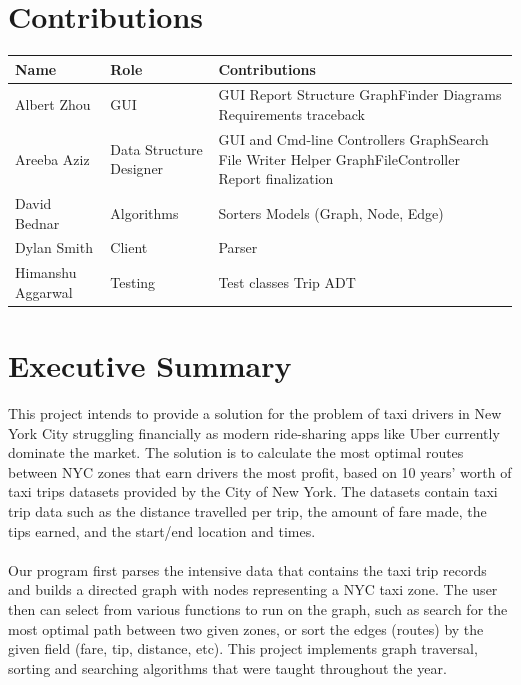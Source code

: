 \documentclass[12pt]{article}
\begin{document}
\newpage

\section*{Contributions}

\begin{tabular}{|p{4cm}|p{5.5cm}|p{7cm}|}
\hline
\textbf{Name} & \textbf{Role} & \textbf{Contributions}\\
\hline
Albert Zhou & GUI & GUI \newline Report Structure \newline GraphFinder \newline Diagrams \newline Requirements traceback \\
\hline
Areeba Aziz & Data Structure Designer & GUI and Cmd-line Controllers \newline GraphSearch \newline File Writer Helper \newline GraphFileController \newline Report finalization\\
\hline
David Bednar & Algorithms & Sorters \newline Models (Graph, Node, Edge) \\
\hline
Dylan Smith & Client & Parser \\
\hline
Himanshu Aggarwal & Testing & Test classes \newline Trip ADT\\
\hline
\end{tabular}

\newpage

\section*{Executive Summary}
This project intends to provide a solution for the problem of taxi drivers in New York City
struggling financially as modern ride-sharing apps like Uber currently dominate the market. The solution is to calculate the most optimal routes between NYC zones that earn drivers the most profit, based on 10 years’ worth of taxi trips datasets provided by the City of New York. The datasets contain taxi trip data such as the distance travelled per trip, the amount of fare made, the tips earned, and the start/end location and times. \\ \\
Our program first parses the intensive data that contains the taxi trip records and builds a directed graph with nodes representing a NYC taxi zone. The user then can select from various functions to run on the graph, such as search for the most optimal path between two given zones, or sort the edges (routes) by the given field (fare, tip, distance, etc). This project implements graph traversal, sorting and searching algorithms that were taught throughout the year. 
\end{document}
